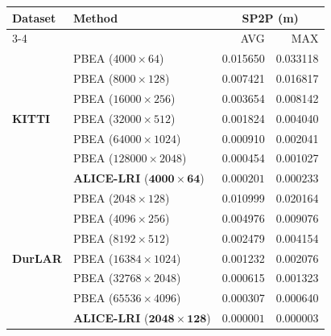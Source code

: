 \begin{tabular}{llrr}
\toprule
\multirow{2}{*}{\textbf{Dataset}} & \multirow{2}{*}{\textbf{Method}} & \multicolumn{2}{c}{\textbf{SP2P (m)}} \\
\cmidrule(l){3-4}
 &  & AVG & MAX \\
\midrule
\multirow{7}{*}{\textbf{KITTI}} & PBEA ($\num{4000} \times \num{64}$) & 0.015650 & 0.033118 \\
 & PBEA ($\num{8000} \times \num{128}$) & 0.007421 & 0.016817 \\
 & PBEA ($\num{16000} \times \num{256}$) & 0.003654 & 0.008142 \\
 & PBEA ($\num{32000} \times \num{512}$) & 0.001824 & 0.004040 \\
 & PBEA ($\num{64000} \times \num{1024}$) & 0.000910 & 0.002041 \\
 & PBEA ($\num{128000} \times \num{2048}$) & 0.000454 & 0.001027 \\
 & \textbf{ALICE-LRI} ($\mathbf{4000} \times \mathbf{64}$) & $\mathbf{0.000201}$ & $\mathbf{0.000233}$ \\
\midrule
\multirow{7}{*}{\textbf{DurLAR}} & PBEA ($\num{2048} \times \num{128}$) & 0.010999 & 0.020164 \\
 & PBEA ($\num{4096} \times \num{256}$) & 0.004976 & 0.009076 \\
 & PBEA ($\num{8192} \times \num{512}$) & 0.002479 & 0.004154 \\
 & PBEA ($\num{16384} \times \num{1024}$) & 0.001232 & 0.002076 \\
 & PBEA ($\num{32768} \times \num{2048}$) & 0.000615 & 0.001323 \\
 & PBEA ($\num{65536} \times \num{4096}$) & 0.000307 & 0.000640 \\
 & \textbf{ALICE-LRI} ($\mathbf{2048} \times \mathbf{128}$) & $\mathbf{0.000001}$ & $\mathbf{0.000003}$ \\
\bottomrule
\end{tabular}